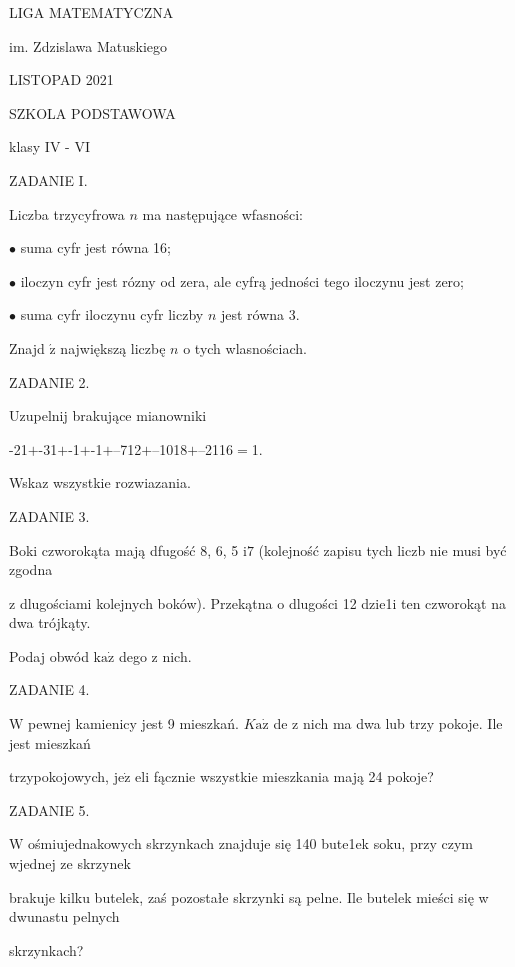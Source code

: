\documentclass[a4paper,12pt]{article}
\begin{document}
LIGA MATEMATYCZNA

im. Zdzislawa Matuskiego

LISTOPAD 2021

SZKOLA PODSTAWOWA

klasy IV - VI

ZADANIE I.

Liczba trzycyfrowa $n$ ma następujące wfasności:

$\bullet$ suma cyfr jest równa 16;

$\bullet$ iloczyn cyfr jest rózny od zera, ale cyfrą jedności tego iloczynu jest zero;

$\bullet$ suma cyfr iloczynu cyfr liczby $n$ jest równa 3.

Znajd $\acute{\mathrm{z}}$ największą liczbę $n$ o tych wlasnościach.

ZADANIE 2.

Uzupelnij brakujące mianowniki

-21$+$-31$+$-1$+$-1$+$--712$+$--1018$+$--2116$=$1.

Wskaz wszystkie rozwiazania.

ZADANIE 3.

Boki czworokąta mają dfugość 8, 6, 5 $\mathrm{i} 7$ (kolejność zapisu tych liczb nie musi być zgodna

z dlugościami kolejnych boków). Przekątna o dlugości 12 dzie1i ten czworokąt na dwa trójkąty.

Podaj obwód $\mathrm{k}\mathrm{a}\dot{\mathrm{z}}$ dego z nich.

ZADANIE 4.

$\mathrm{W}$ pewnej kamienicy jest 9 mieszkań. $K\mathrm{a}\dot{\mathrm{z}}$ de z nich ma dwa lub trzy pokoje. Ile jest mieszkań

trzypokojowych, $\mathrm{j}\mathrm{e}\dot{\mathrm{z}}$ eli fącznie wszystkie mieszkania mają 24 pokoje?

ZADANIE 5.

$\mathrm{W}$ ośmiujednakowych skrzynkach znajduje się 140 bute1ek soku, przy czym wjednej ze skrzynek

brakuje kilku butelek, zaś pozostałe skrzynki są pelne. Ile butelek mieści się w dwunastu pelnych

skrzynkach?
\end{document}

